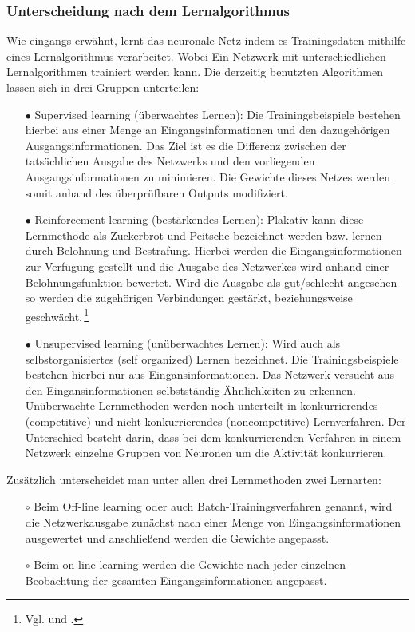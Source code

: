 \subsubsection{Unterscheidung nach dem Lernalgorithmus }
Wie eingangs erwähnt, lernt das neuronale Netz indem es Trainingsdaten mithilfe eines Lernalgorithmus verarbeitet. Wobei Ein Netzwerk mit unterschiedlichen Lernalgorithmen trainiert werden kann. Die derzeitig benutzten Algorithmen lassen sich in drei Gruppen unterteilen: 
\begin{itemize}
\item[\textbf{$\bullet$}] Supervised learning (überwachtes Lernen): Die Trainingsbeispiele bestehen hierbei aus einer Menge an Eingangsinformationen und den dazugehörigen Ausgangsinformationen. Das Ziel ist es die Differenz zwischen der tatsächlichen Ausgabe des Netzwerks und den vorliegenden Ausgangsinformationen zu minimieren. Die Gewichte dieses Netzes werden somit anhand des überprüfbaren Outputs modifiziert.


\item[\textbf{$\bullet$}] Reinforcement learning (bestärkendes Lernen): Plakativ kann diese Lernmethode als Zuckerbrot und Peitsche bezeichnet werden bzw. lernen durch Belohnung und Bestrafung. Hierbei werden die Eingangsinformationen zur Verfügung gestellt und die Ausgabe des Netzwerkes wird anhand einer Belohnungsfunktion bewertet. Wird die Ausgabe als gut/schlecht angesehen so werden die zugehörigen Verbindungen gestärkt, beziehungsweise geschwächt.\,\footnote{Vgl. \citet[201]{dkriesel07} und \citet[A2.3:5]{Fiesler96}.}


\item[\textbf{$\bullet$}] Unsupervised learning (unüberwachtes Lernen): Wird auch als selbstorganisiertes (self organized) Lernen bezeichnet. Die Trainingsbeispiele bestehen hierbei nur aus Eingansinformationen. Das Netzwerk versucht aus den Eingansinformationen selbstständig Ähnlichkeiten zu erkennen. Unüberwachte Lernmethoden werden noch unterteilt in konkurrierendes (competitive) und nicht konkurrierendes (noncompetitive) Lernverfahren. Der Unterschied besteht darin, dass bei dem konkurrierenden Verfahren in einem Netzwerk einzelne Gruppen von Neuronen um die Aktivität konkurrieren.\,

\end{itemize}

Zusätzlich unterscheidet man unter allen drei Lernmethoden zwei Lernarten:\,

\begin{itemize}
\item[\textbf{$\circ$}] Beim Off-line learning oder auch Batch-Trainingsverfahren genannt, wird die Netzwerkausgabe zunächst nach einer Menge von Eingangsinformationen ausgewertet und anschließend werden die Gewichte angepasst.


\item[\textbf{$\circ$}] Beim on-line learning werden die Gewichte nach jeder einzelnen Beobachtung der gesamten Eingangsinformationen angepasst.

\end{itemize}


